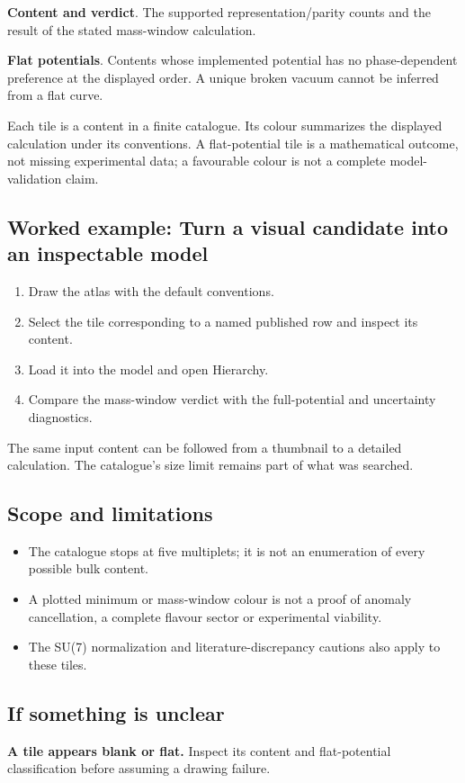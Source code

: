 \documentclass[11pt,a4paper]{article}
\begin{document}
\textbf{Content and verdict}. The supported representation/parity counts and the result of the stated mass-window calculation.

\textbf{Flat potentials}. Contents whose implemented potential has no phase-dependent preference at the displayed order. A unique broken vacuum cannot be inferred from a flat curve.

Each tile is a content in a finite catalogue. Its colour summarizes the displayed calculation under its conventions. A flat-potential tile is a mathematical outcome, not missing experimental data; a favourable colour is not a complete model-validation claim.
\subsection*{Worked example: Turn a visual candidate into an inspectable model}
\begin{enumerate}
\item Draw the atlas with the default conventions.
\item Select the tile corresponding to a named published row and inspect its content.
\item Load it into the model and open Hierarchy.
\item Compare the mass-window verdict with the full-potential and uncertainty diagnostics.
\end{enumerate}
The same input content can be followed from a thumbnail to a detailed calculation. The catalogue's size limit remains part of what was searched.
\subsection*{Scope and limitations}
\begin{itemize}
\item The catalogue stops at five multiplets; it is not an enumeration of every possible bulk content.
\item A plotted minimum or mass-window colour is not a proof of anomaly cancellation, a complete flavour sector or experimental viability.
\item The SU(7) normalization and literature-discrepancy cautions also apply to these tiles.
\end{itemize}
\subsection*{If something is unclear}
\textbf{A tile appears blank or flat.} Inspect its content and flat-potential classification before assuming a drawing failure.
\end{document}
